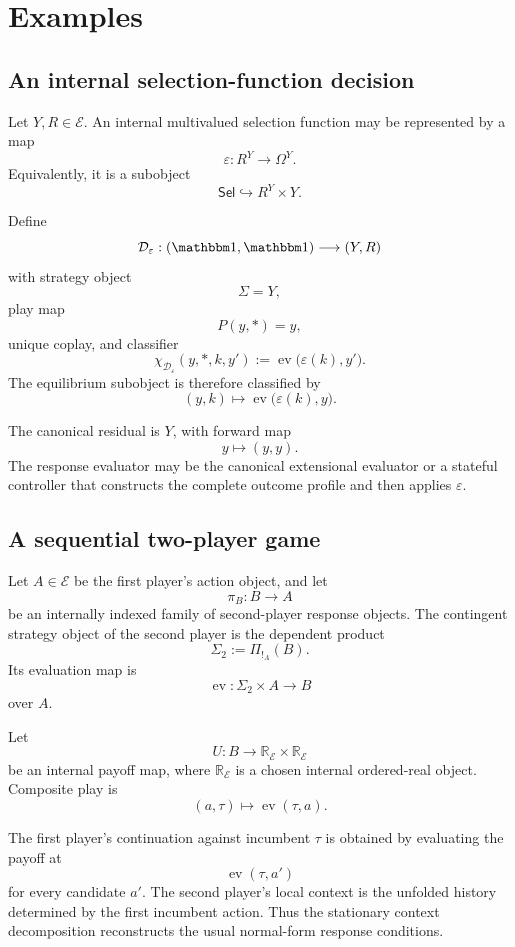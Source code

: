 \section{Examples}
\label{sec:strategic-mealy-examples}

\subsection{An internal selection-function decision}
\label{subsec:selection-function-decision}

Let \(Y,R\in\mathcal E\). An internal multivalued selection function may be represented by a map
\[
  \varepsilon:
  R^Y\longrightarrow\Omega^Y.
\]
Equivalently, it is a subobject
\[
  \mathsf{Sel}
  \hookrightarrow
  R^Y\times Y.
\]

Define
\[
  \mathcal D_\varepsilon:
  (\mathbbm1,\mathbbm1)
  \longrightarrow
  (Y,R)
\]
with strategy object
\[
  \Sigma=Y,
\]
play map
\[
  P(y,*)=y,
\]
unique coplay, and classifier
\[
  \chi_{\mathcal D_\varepsilon}
  (y,*,k,y')
  :=
  \operatorname{ev}
  \bigl(
    \varepsilon(k),
    y'
  \bigr).
\]
The equilibrium subobject is therefore classified by
\[
  (y,k)
  \longmapsto
  \operatorname{ev}
  \bigl(
    \varepsilon(k),
    y
  \bigr).
\]

The canonical residual is \(Y\), with forward map
\[
  y\longmapsto(y,y).
\]
The response evaluator may be the canonical extensional evaluator or a stateful controller that
constructs the complete outcome profile and then applies \(\varepsilon\).

\subsection{A sequential two-player game}
\label{subsec:sequential-two-player-game}

Let \(A\in\mathcal E\) be the first player's action object, and let
\[
  \pi_B:B\to A
\]
be an internally indexed family of second-player response objects. The contingent strategy object
of the second player is the dependent product
\[
  \Sigma_2
  :=
  \Pi_{!_A}(B).
\]
Its evaluation map is
\[
  \operatorname{ev}:
  \Sigma_2\times A\to B
\]
over \(A\).

Let
\[
  U:B\to\mathbb R_{\mathcal E}\times\mathbb R_{\mathcal E}
\]
be an internal payoff map, where \(\mathbb R_{\mathcal E}\) is a chosen internal ordered-real
object. Composite play is
\[
  (a,\tau)\longmapsto\operatorname{ev}(\tau,a).
\]

The first player's continuation against incumbent \(\tau\) is obtained by evaluating the payoff at
\[
  \operatorname{ev}(\tau,a')
\]
for every candidate \(a'\). The second player's local context is the unfolded history determined by
the first incumbent action. Thus the stationary context decomposition reconstructs the usual
normal-form response conditions.

